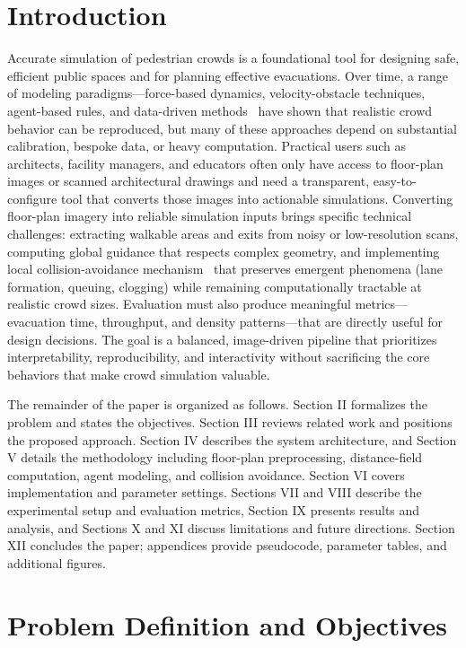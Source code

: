 \documentclass[conference]{IEEEtran}
\begin{document}
\section{Introduction}
Accurate simulation of pedestrian crowds is a foundational tool for designing
safe, efficient public spaces and for planning effective evacuations. Over
time, a range of modeling paradigms—force-based dynamics, velocity-obstacle
techniques, agent-based rules, and data-driven
methods~\cite{helbing2000social,van2008reciprocal,pan2016crowd} have shown that
realistic crowd behavior can be reproduced, but many of these approaches depend
on substantial calibration, bespoke data, or heavy computation. Practical users
such as architects, facility managers, and educators often only have access to
floor-plan images or scanned architectural drawings and need a transparent,
easy-to-configure tool that converts those images into actionable simulations.
Converting floor-plan imagery into reliable simulation inputs brings specific
technical challenges: extracting walkable areas and exits from noisy or
low-resolution scans, computing global guidance that respects complex geometry,
and implementing local collision-avoidance mechanism~\cite{van2008reciprocal}
that preserves emergent phenomena (lane formation, queuing, clogging) while
remaining computationally tractable at realistic crowd sizes. Evaluation must
also produce meaningful metrics—evacuation time, throughput, and density
patterns—that are directly useful for design decisions. The goal is a balanced,
image-driven pipeline that prioritizes interpretability, reproducibility, and
interactivity without sacrificing the core behaviors that make crowd simulation
valuable.

The remainder of the paper is organized as follows. Section II formalizes the
problem and states the objectives. Section III reviews related work and
positions the proposed approach. Section IV describes the system architecture,
and Section V details the methodology including floor-plan preprocessing,
distance-field computation, agent modeling, and collision avoidance. Section VI
covers implementation and parameter settings. Sections VII and VIII describe
the experimental setup and evaluation metrics, Section IX presents results and
analysis, and Sections X and XI discuss limitations and future directions.
Section XII concludes the paper; appendices provide pseudocode, parameter
tables, and additional figures.

\section{Problem Definition and Objectives}
\end{document}
